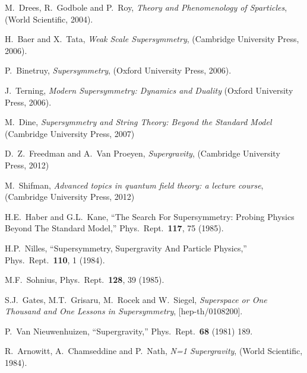 \documentclass[12pt]{article}
\begin{document}
\begin{thebibliography}{999}
M.~Drees, R.~Godbole and P.~Roy, 
  {\em Theory and Phenomenology of Sparticles}, 
  (World Scientific, 2004).

H.~Baer and X.~Tata, 
  {\em Weak Scale Supersymmetry},
  (Cambridge University Press, 2006).

P.~Binetruy,
  {\em Supersymmetry},
  (Oxford University Press, 2006).

J.~Terning,
  {\em Modern Supersymmetry: Dynamics and Duality}
  (Oxford University Press, 2006).

M.~Dine,
  {\em Supersymmetry and String Theory: Beyond the Standard Model}
  (Cambridge University Press, 2007) 

  D.~Z.~Freedman and A.~Van Proeyen, 
  {\em Supergravity}, (Cambridge University Press, 2012) 

  M.~Shifman,
  {\em Advanced topics in quantum field theory: a lecture course},
  (Cambridge University Press, 2012) 
  
  
H.E.~Haber and G.L.~Kane,
  ``The Search For Supersymmetry: Probing Physics Beyond The Standard Model,''
  Phys.\ Rept.\  {\bf 117}, 75 (1985).

H.P.~Nilles, 
  ``Supersymmetry, Supergravity And Particle Physics,''
  Phys.\ Rept.\  {\bf 110}, 1 (1984).

M.F.~Sohnius,
  Phys.\ Rept.\  {\bf 128}, 39 (1985).

S.J.~Gates, M.T.~Grisaru, M.~Rocek and W.~Siegel,
  {\em Superspace or One Thousand and One Lessons in Supersymmetry},
  [hep-th/0108200].

P.~Van Nieuwenhuizen,
  ``Supergravity,''
  Phys.\ Rept.\  {\bf 68} (1981) 189.

R.~Arnowitt, A.~Chamseddine and P.~Nath,
  {\em N=1 Supergravity}, 
  (World Scientific, 1984).


\end{thebibliography}
\end{document}
